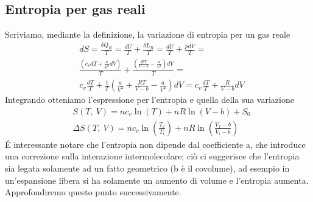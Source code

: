 \documentclass[10pt,a4paper]{article}
\begin{document}
\subsection{Entropia per gas reali}
Scriviamo, mediante la definizione, la variazione di entropia per un gas reale
\begin{align*}
	&dS = \frac{\delta Q_R}{T}=\frac{dU}{T}+\frac{\delta L_R}{T}=\frac{dU}{T}+\frac{pdV}{T}=\\
	&\frac{(c_v dT + \frac{a}{V^2}dV)}{T} + \frac{\left(\frac{RT}{V-b}-\frac{a}{V^2}\right)dV}{T}=\\
	&c_v \frac{dT}{T}+\frac{1}{T}\left(\frac{a}{V^2}+\frac{RT}{V-b}-\frac{a}{V^2}\right)dV = c_v \frac{dT}{T}+ \frac{R}{V-b}dV
\end{align*}
Integrando otteniamo l'espressione per l'entropia e quella della sua variazione
\begin{align*}
	&S(T,\ V) = n c_v \ln(T)+n R \ln(V-b)+S_0\\
	&\Delta S(T,\ V) = n c_v \ln\left(\frac{T_f}{T_i}\right)+n R \ln\left(\frac{V_f - b}{V_i - b}\right)
\end{align*}
\'{E} interessante notare che l'entropia non dipende dal coefficiente a, che introduce una correzione sulla interazione intermolecolare; ciò ci suggerisce che l'entropia sia legata solamente ad un fatto geometrico (b è il covolume), ad esempio in un'espansione libera si ha solamente un aumento di volume e l'entropia aumenta. Approfondiremo questo punto successivamente. 
\end{document}
